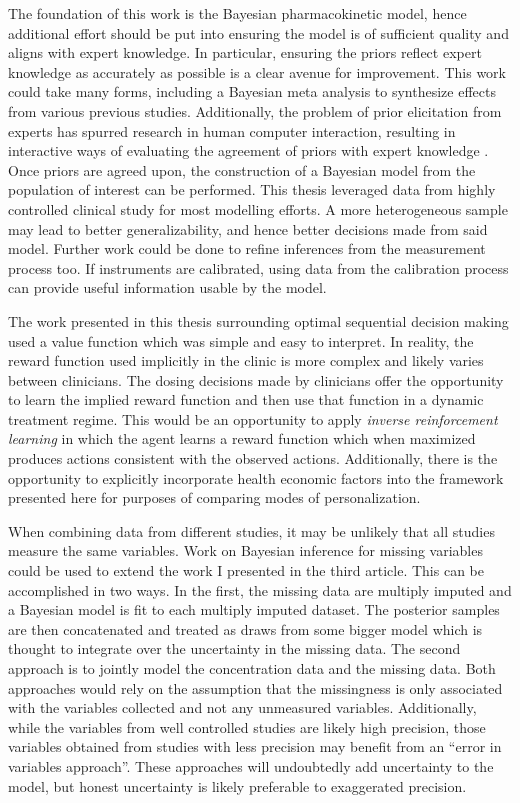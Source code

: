 The foundation of this work is the Bayesian pharmacokinetic model, hence additional effort should be put into ensuring the model is of sufficient quality and aligns with expert knowledge.  In particular, ensuring the priors reflect expert knowledge as accurately as possible is a clear avenue for improvement.  This work could take many forms, including a Bayesian meta analysis to synthesize effects from various previous studies.  Additionally, the problem of prior elicitation from experts has spurred research in human computer interaction, resulting in interactive ways of evaluating the agreement of priors with expert knowledge \cite{sarma2020prior}.  Once priors are agreed upon, the construction of a Bayesian model from the population of interest can be performed.  This thesis leveraged data from highly controlled clinical study for most modelling efforts.  A more heterogeneous sample may lead to better generalizability, and hence better decisions made from said model.  Further work could be done to refine inferences from the measurement process too.  If instruments are calibrated, using data from the calibration process can provide useful information usable by the model.

The work presented in this thesis surrounding optimal sequential decision making used a value function which was simple and easy to interpret.  In reality, the reward function used implicitly in the clinic is more complex and likely varies between clinicians.  The dosing decisions made by clinicians offer the opportunity to learn the implied reward function and then use that function in a dynamic treatment regime.  This would be an opportunity to apply \textit{inverse reinforcement learning} in which the agent learns a reward function which when maximized produces actions consistent with the observed actions.  Additionally, there is the opportunity to explicitly incorporate health economic factors into the  framework presented here for purposes of comparing modes of personalization.

When combining data from different studies, it may be unlikely that all studies measure the same variables.  Work on Bayesian inference for missing variables could be used to extend the work I presented in the third article. This can be accomplished in two ways.  In the first, the missing data are multiply imputed and a Bayesian model is fit to each multiply imputed dataset.  The posterior samples are then concatenated and treated as draws from some bigger model which is thought to integrate over the uncertainty in the missing data.  The second approach is to jointly model the concentration data and the missing data.  Both approaches would rely on the assumption that the missingness is only associated with the variables collected and not any unmeasured variables.  Additionally, while the variables from well controlled studies are likely high precision, those variables obtained from studies with less precision may benefit from an ``error in variables approach''.  These approaches will undoubtedly add uncertainty to the model, but honest uncertainty is likely preferable to exaggerated precision.

